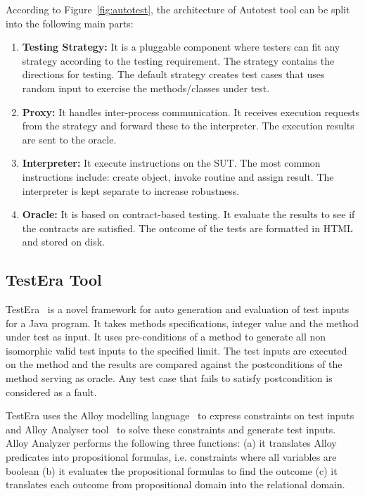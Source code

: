 \noindent According to Figure~\ref{fig:autotest}, the architecture of Autotest tool can be split into the following main parts:
\begin{enumerate}
\item \textbf{Testing Strategy:} It is a pluggable component where testers can fit any strategy according to the testing requirement. The strategy contains the directions for testing.%
The default strategy creates test cases that uses random input to exercise the methods/classes under test.
\item \textbf{Proxy:} It handles inter-process communication. It receives execution requests from the strategy and forward these to the interpreter. The execution results are sent to the oracle.
\item \textbf{Interpreter:} It execute instructions on the SUT. The most common instructions include: create object, invoke routine and assign result. The interpreter is kept separate to increase robustness.
\item \textbf{Oracle:} It is based on contract-based testing. It evaluate the results to see if the contracts are satisfied. The outcome of the tests are formatted in HTML and stored on disk.
\end{enumerate}

\subsection{TestEra Tool}
TestEra~\cite{Khurshid2004} is a novel framework for auto generation and evaluation of test inputs for a Java program. It takes methods specifications, integer value and the method under test as input. It uses pre-conditions of a method to generate all non isomorphic valid test inputs to the specified limit. The test inputs are executed on the method and the results are compared against the postconditions of the method serving as oracle. Any test case that fails to satisfy postcondition is considered as a fault. 

TestEra uses the Alloy modelling language~\cite{jackson2001micromodularity} to express constraints on test inputs and Alloy Analyser tool~\cite{jackson2000alcoa} to solve these constraints and generate test inputs. Alloy Analyzer performs the following three functions: (a) it translates Alloy predicates into propositional formulas, i.e. constraints where all variables are boolean (b) it evaluates the propositional formulas to find the outcome (c) it translates each outcome from propositional domain into the relational domain.

